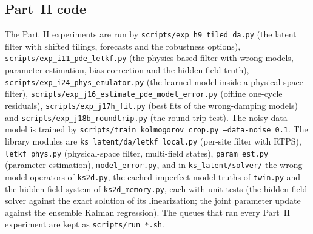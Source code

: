\subsection{Part~II code}

The Part~II experiments are run by \texttt{scripts/exp\_h9\_tiled\_da.py} (the latent filter with
shifted tilings, forecasts and the robustness options), \texttt{scripts/exp\_i11\_pde\_letkf.py} (the
physics-based filter with wrong models, parameter estimation, bias correction and the hidden-field
truth), \texttt{scripts/exp\_i24\_phys\_emulator.py} (the learned model inside a physical-space
filter), \texttt{scripts/exp\_j16\_estimate\_pde\_model\_error.py} (offline one-cycle residuals),
\texttt{scripts/exp\_j17h\_fit.py} (best fits of the wrong-damping models) and
\texttt{scripts/exp\_j18b\_roundtrip.py} (the round-trip test). The noisy-data model is trained by
\texttt{scripts/train\_kolmogorov\_crop.py --data-noise 0.1}. The library modules are
\texttt{ks\_latent/da/letkf\_local.py} (per-site filter with RTPS), \texttt{letkf\_phys.py}
(physical-space filter, multi-field states), \texttt{param\_est.py} (parameter estimation),
\texttt{model\_error.py}, and in \texttt{ks\_latent/solver/} the wrong-model operators of
\texttt{ks2d.py}, the cached imperfect-model truths of \texttt{twin.py} and the hidden-field system of
\texttt{ks2d\_memory.py}, each with unit tests (the hidden-field solver against the exact solution of
its linearization; the joint parameter update against the ensemble Kalman regression). The queues
that ran every Part~II experiment are kept as \texttt{scripts/run\_*.sh}.
